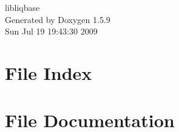 \documentclass[a4paper]{book}
\begin{document}
\begin{titlepage}
\vspace*{7cm}
\begin{center}
{\Large libliqbase }\\
\vspace*{1cm}
{\large Generated by Doxygen 1.5.9}\\
\vspace*{0.5cm}
{\small Sun Jul 19 19:43:30 2009}\\
\end{center}
\end{titlepage}
\clearemptydoublepage
{}
\tableofcontents
\clearemptydoublepage
{}
\chapter{File Index}

\chapter{File Documentation}










\printindex
\end{document}
